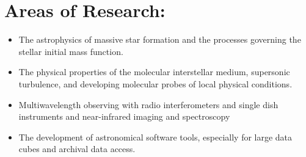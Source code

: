 \section*{Areas of Research: }
\begin{itemize}
    \item The astrophysics of massive star formation and the processes
        governing the stellar initial mass function.
    \item The physical properties of the molecular interstellar medium,
        supersonic turbulence, and developing molecular probes
        of local physical conditions. 
    \item Multiwavelength observing with radio interferometers and single dish
        instruments and near-infrared imaging and spectroscopy
    \item The development of astronomical software tools, especially for large
        data cubes and archival data access.
\end{itemize}

